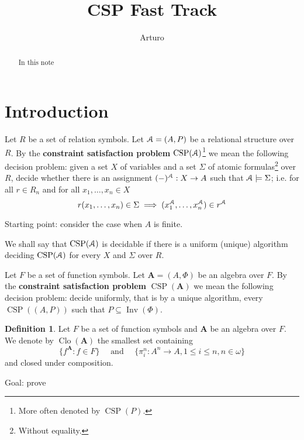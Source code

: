 \documentclass{amsart}
\theoremstyle{plain}
\theoremstyle{definition}
\newtheorem{definition}[theorem]{Definition}
\theoremstyle{remark}
\DeclareMathOperator{\Clo}{Clo}
\DeclareMathOperator{\CSP}{CSP}
\DeclareMathOperator{\Inv}{Inv}
\begin{document}
\title{CSP Fast Track}
\author{Arturo}


\begin{abstract}
   In this note 
\end{abstract}

\maketitle

\section{Introduction}
Let $R$ be a set of relation symbols. 
Let $\EuScript{A}=(A, P)$ be a relational structure over $R$.
By the \textbf{constraint satisfaction problem} $\CSP(\EuScript{A})$\footnote{More often denoted by $\CSP(P)$.} we mean the following decision problem: 
given a set $X$ of variables and a set $\Sigma$ of atomic formulas\footnote{Without equality.} over $R$, decide whether there is 
an assignment $(-)^{\EuScript{A}} : X \to A$ such that 
$\EuScript{A} \models \Sigma$; 
i.e. for all $r \in R_n$ and for all $x_1, \ldots, x_n \in X$ 
\begin{equation}
    r(x_1, \ldots, x_n) \in \Sigma \implies  (x_1^{{\EuScript{A}}}, \ldots, x_n^{{\EuScript{A}}}) \in r^{\EuScript{A}}
\end{equation}

Starting point: consider the case when $A$ is finite. 

We shall say that $\CSP({\EuScript{A}})$ is decidable if there is a uniform (unique) algorithm deciding $\CSP({\EuScript{A}})$ for every $X$ and $\Sigma$ over $R$. 

Let $F$ be a set of function symbols. 
Let $\mathbf{A}=(A, \Phi)$ be an algebra over $F$. 
By the \textbf{constraint satisfaction problem} $\CSP(\mathbf{A})$ we mean the following decision problem:
decide uniformly, that is by a unique algorithm, every $\CSP((A,P))$ such that $P \subseteq \Inv(\Phi)$. 

\begin{definition}
    Let $F$ be a set of function symbols and $\mathbf{A}$ be an algebra over $F$. 
    We denote by $\Clo(\mathbf{A})$ the smallest set containing 
    \begin{equation*}
        \{f^\mathbf{A}: f \in F\} \quad \text{ and } \quad \{\pi^n_i: A^n \to A, 1 \le i \le n, n \in \omega\}
    \end{equation*}
and closed under composition. 
\end{definition}
Goal: prove 
\end{document}

